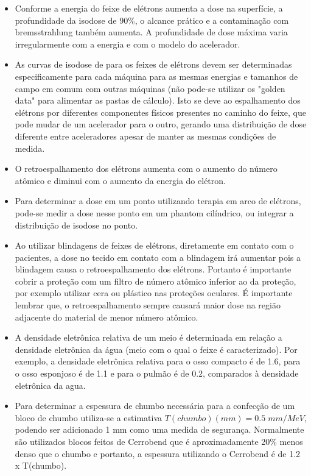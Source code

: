 \documentclass[11pt,a4paper]{article}
\newcounter{exemplo}
\begin{document}
\begin{exemplo}
\begin{itemize}
        \item Conforme a energia do feixe de elétrons aumenta a dose na superfície, a profundidade da isodose de 90\%, o alcance prático e a contaminação com bremsstrahlung também aumenta. A profundidade de dose máxima varia irregularmente com a energia e com o modelo do acelerador.
        
        \item As curvas de isodose de para os feixes de elétrons devem ser determinadas especificamente para cada máquina para as mesmas energias e tamanhos de campo em comum com outras máquinas (não pode-se utilizar os "golden data" para alimentar as pastas de cálculo). Isto se deve ao espalhamento dos elétrons por diferentes componentes físicos presentes no caminho do feixe, que pode mudar de um acelerador para o outro, gerando uma distribuição de dose diferente entre aceleradores apesar de manter as mesmas condições de medida.
        
        \item O retroespalhamento dos elétrons aumenta com o aumento do número atômico e diminui com o aumento da energia do elétron. 
        
        \item Para determinar a dose em um ponto utilizando terapia em arco de elétrons, pode-se medir a dose nesse ponto em um phantom cilíndrico, ou integrar a distribuição de isodose no ponto.
        
        \item Ao utilizar blindagens de feixes de elétrons, diretamente em contato com o pacientes, a dose no tecido em contato com a blindagem irá aumentar pois a blindagem causa o retroespalhamento dos elétrons. Portanto é importante cobrir a proteção com um filtro de número atômico inferior ao da proteção, por exemplo utilizar cera ou plástico nas proteções oculares. É importante lembrar que, o retroespalhamento sempre causará maior dose na região adjacente do material de menor número atômico.
        
        \item A densidade eletrônica relativa de um meio  é determinada em relação a densidade eletrônica da água (meio com o qual o feixe é caracterizado). Por exemplo, a densidade eletrônica relativa para o osso compacto é de 1.6, para o osso esponjoso é de 1.1 e para o pulmão é de 0.2, comparados à densidade eletrônica da agua.

        \item Para determinar a espessura de chumbo necessária para a confecção de um bloco de chumbo utiliza-se a estimativa $T(chumbo)(mm) = 0.5\;mm/MeV$, podendo ser adicionado 1 mm como uma medida de segurança. Normalmente são utilizados blocos feitos de Cerrobend que é aproximadamente 20\% menos denso que o chumbo e portanto, a espessura utilizando o Cerrobend é de 1.2 x T(chumbo). 


\end{itemize}
\end{exemplo}
\end{document}
